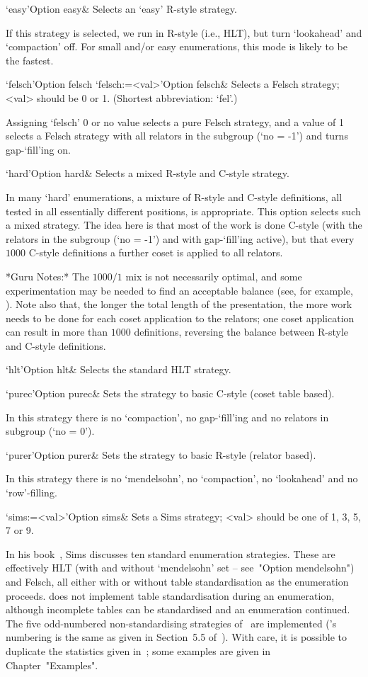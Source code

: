 \>`easy'{Option easy}&
Selects an \lq{}easy' R-style strategy.

If this strategy is selected, we run in R-style (i.e., HLT), but  turn
`lookahead' and `compaction' off. For small and/or easy  enumerations,
this mode is likely to be the fastest.

\>`felsch'{Option felsch}
\>`felsch:=<val>'{Option felsch}&
Selects a Felsch strategy; <val> should be 0 or 1. 
(Shortest abbreviation: `fel'.)

Assigning `felsch' 0 or no value selects a pure Felsch strategy, and a
value of 1 selects a Felsch strategy with all relators in the subgroup
(`no = -1') and turns gap-`fill'ing on.

\>`hard'{Option hard}&  
Selects a mixed R-style and C-style strategy.

In many \lq{}hard' enumerations, a  mixture  of  R-style  and  C-style
definitions, all tested in all  essentially  different  positions,  is
appropriate. This option selects such a mixed strategy. The idea  here
is that most of the work is done C-style (with  the  relators  in  the
subgroup (`no = -1') and with gap-`fill'ing active),  but  that  every
$1000$ C-style definitions a further coset is applied to all relators.

*Guru  Notes:*
The $1000/1$ mix is not necessarily optimal, and some  experimentation
may be needed  to  find  an  acceptable  balance  (see,  for  example,
\cite{HR99b}). Note also that, the longer  the  total  length  of  the
presentation,  the  more  work  needs  to  be  done  for  each   coset
application to the relators; one coset application can result in  more
than $1000$ definitions, reversing the  balance  between  R-style  and
C-style definitions.

\>`hlt'{Option hlt}&
Selects the standard HLT strategy.

\>`purec'{Option purec}&
Sets the strategy to basic C-style (coset table based).

In this strategy there is no `compaction',  no  gap-`fill'ing  and  no
relators in subgroup (`no = 0').

\>`purer'{Option purer}&
Sets the strategy  to basic R-style (relator based).

In this  strategy  there  is  no  `mendelsohn',  no  `compaction',  no
`lookahead' and no `row'-filling.

\>`sims:=<val>'{Option sims}&
Sets a Sims strategy; <val> should be one of 1, 3, 5, 7 or 9.

In his book~\cite{Sim94},  Sims  discusses  ten  standard  enumeration
strategies. These are effectively HLT (with and  without  `mendelsohn'
set -- see~"Option mendelsohn") and Felsch, all either with or without
table standardisation as the enumeration  proceeds.  {\ACE}  does  not
implement  table  standardisation  during  an  enumeration,   although
incomplete tables can be standardised and  an  enumeration  continued.
The five odd-numbered non-standardising strategies of~\cite{Sim94} are
implemented ({\ACE}'s numbering is the same as  given  in  Section~5.5
of~\cite{Sim94}).  With  care,  it  is  possible  to   duplicate   the
statistics  given  in~\cite{Sim94};  some  examples   are   given   in
Chapter~"Examples". 

